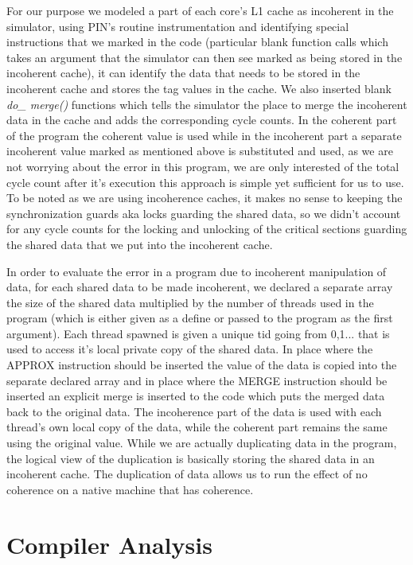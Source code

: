 \documentclass[12pt,conference]{IEEEtran}
\begin{document}
For our purpose we modeled a part of each core's L1 cache as incoherent
in the simulator, using PIN's routine instrumentation and identifying
special instructions that we marked in the code (particular blank function 
calls which takes an argument that the simulator can then see marked as 
being stored in the incoherent cache), it can identify the 
data that needs to be stored in the incoherent cache and stores the
tag values in the cache. We also inserted blank \textit{do\_ merge()}
functions which tells the simulator the place to merge the incoherent
data in the cache and adds the corresponding cycle counts. In the 
coherent part of the program the coherent value is used while in the
incoherent part a separate incoherent value marked as mentioned above
is substituted and used, as we are not worrying about the error in
this program, we are only interested of the total cycle count after
it's execution this approach is simple yet sufficient for us to use.
To be noted as we are using incoherence caches, it makes no sense
to keeping the synchronization guards aka locks guarding the shared
data, so we didn't account for any cycle counts for the locking and
unlocking of the critical sections guarding the shared data that
we put into the incoherent cache.

In order to evaluate the error in a program due to incoherent 
manipulation of data, for each shared data to be made incoherent,
we declared a separate array the size of the shared data multiplied
by the number of threads used in the program (which is either given
as a define or passed to the program as the first argument). Each 
thread spawned is given a unique tid going from 0,1... that is used
to access it's local private copy of the shared data. In place where
the APPROX instruction should be inserted the value of the data is
copied into the separate declared array and in place where the MERGE
instruction should be inserted an explicit merge is inserted to the
code which puts the merged data back to the original data. The 
incoherence part of the data is used with each thread's own local
copy of the data, while the coherent part remains the same using
the original value. While we are actually duplicating data in 
the program, the logical view of the duplication is basically
storing the shared data in an incoherent cache. The duplication of data
allows us to run the effect of no coherence on a native machine
that has coherence.

\section{Compiler Analysis}
\end{document}

